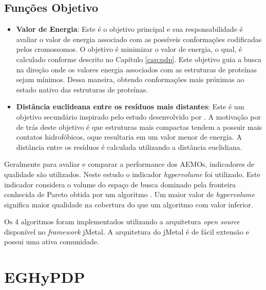 \subsection{Funções Objetivo}


\begin{itemize}
	\item \textbf{Valor de Energia}: Este é o objetivo principal e sua responsabilidade é avaliar o valor de energia associado com as possíveis conformações codificadas pelos cromossomos. O objetivo é minimizar o valor de energia, o qual, é calculado conforme descrito no Capítulo \ref{cap:pdp}. Este objetivo guia a busca na direção onde os valores energia associados com as estruturas de proteínas sejam mínimos. Dessa maneira, obtendo conformações mais próximas ao estado nativo das estruturas de proteínas.

    \item \textbf{Distância euclideana entre os resíduos mais distantes}: Este é um objetivo secundário inspirado pelo estudo desenvolvido por \cite{gabriel2012algoritmos}. A motivação por de trás deste objetivo é que estruturas mais compactas tendem a possuir mais contatos hidrofóbicos, oque resultaria em um valor menor de energia. A distância entre os resíduos é calculada utilizando a distância euclidiana.
   
\end{itemize}

Geralmente para avaliar e comparar a performance dos AEMOs, indicadores de qualidade são utilizados. Neste estudo o indicador \textit{hypervolume} foi utilizado. Este indicador considera o volume do espaço de busca dominado pela fronteira conhecida de Pareto obtida por um algoritmo \cite{zitzler2003performance}. Um maior valor de \textit{hypervolume} significa maior qualidade na cobertura do que um algoritmo com valor inferior.

Os 4 algoritmos foram implementados utilizando a arquitetura \textit{open source} disponível no \textit{framework} jMetal. A arquitetura do jMetal é de fácil extensão e possui uma ativa comunidade.


\section{EGHyPDP}
\label{sec:eghypdp}

